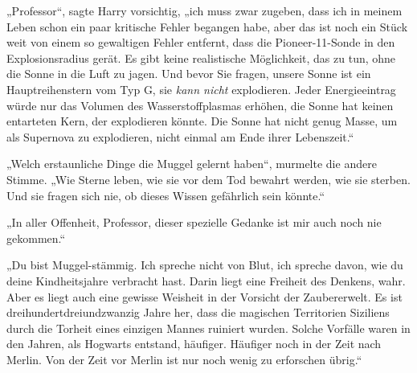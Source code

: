 „Professor“, sagte Harry vorsichtig, „ich muss zwar zugeben, dass ich in meinem Leben schon ein paar kritische Fehler begangen habe, aber das ist noch ein Stück weit von einem so gewaltigen Fehler entfernt, dass die Pioneer-11-Sonde in den Explosionsradius gerät. Es gibt keine realistische Möglichkeit, das zu tun, ohne die Sonne in die Luft zu jagen. Und bevor Sie fragen, unsere Sonne ist ein Hauptreihenstern vom Typ G, sie \emph{kann nicht} explodieren. Jeder Energieeintrag würde nur das Volumen des Wasserstoffplasmas erhöhen, die Sonne hat keinen entarteten Kern, der explodieren könnte. Die Sonne hat nicht genug Masse, um als Supernova zu explodieren, nicht einmal am Ende ihrer Lebenszeit.“

„Welch erstaunliche Dinge die Muggel gelernt haben“, murmelte die andere Stimme. „Wie Sterne leben, wie sie vor dem Tod bewahrt werden, wie sie sterben. Und sie fragen sich nie, ob dieses Wissen gefährlich sein könnte.“

„In aller Offenheit, Professor, dieser spezielle Gedanke ist mir auch noch nie gekommen.“

„Du bist Muggel-stämmig. Ich spreche nicht von Blut, ich spreche davon, wie du deine Kindheitsjahre verbracht hast. Darin liegt eine Freiheit des Denkens, wahr. Aber es liegt auch eine gewisse Weisheit in der Vorsicht der Zaubererwelt. Es ist dreihundertdreiundzwanzig Jahre her, dass die magischen Territorien Siziliens durch die Torheit eines einzigen Mannes ruiniert wurden. Solche Vorfälle waren in den Jahren, als Hogwarts entstand, häufiger. Häufiger noch in der Zeit nach Merlin. Von der Zeit vor Merlin ist nur noch wenig zu erforschen übrig.“

